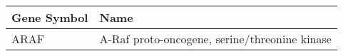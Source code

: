 \begin{tabular}{ll}
\toprule
Gene Symbol &                                          Name \\
\midrule
       ARAF & A-Raf proto-oncogene, serine/threonine kinase \\
\bottomrule
\end{tabular}
